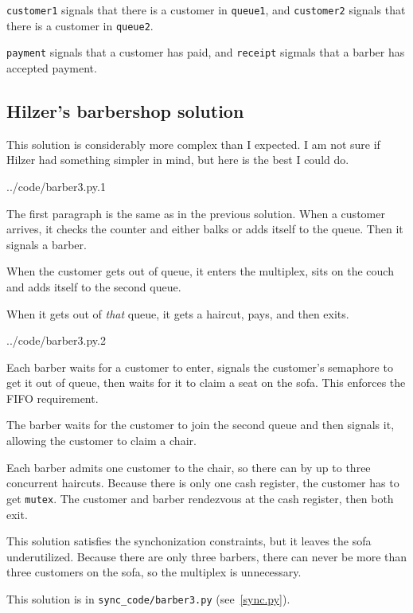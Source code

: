 \documentclass{book}
\newcommand{\clearemptydoublepage}{\newpage\cleardoublepage}
\begin{document}
{\tt customer1} signals that there is a customer in {\tt queue1}, and
{\tt customer2} signals that there is a customer in {\tt queue2}.

{\tt payment} signals that a customer has paid, and {\tt receipt}
sigmals that a barber has accepted payment.



\clearemptydoublepage
\subsection {Hilzer's barbershop solution}

This solution is considerably more complex than I expected.  I
am not sure if Hilzer had something simpler in mind, but here is the
best I could do.


{../code/barber3.py.1}

The first paragraph is the same as in the previous solution.  When
a customer arrives, it checks the counter and either balks or adds
itself to the queue.  Then it signals a barber.

When the customer gets out of queue, it enters the multiplex,
sits on the couch and adds itself to the second queue.

When it gets out of {\em that} queue, it gets a haircut, pays,
and then exits.


{../code/barber3.py.2}

Each barber waits for a customer to enter, signals the customer's
semaphore to get it out of queue, then waits for it to claim a seat
on the sofa.  This enforces the FIFO requirement.

The barber waits for the customer to join the second queue and then
signals it, allowing the customer to claim a chair.

Each barber admits one customer to the chair, so there can by up
to three concurrent haircuts.  Because there is only one cash
register, the customer has to get {\tt mutex}.  The customer
and barber rendezvous at the cash register, then both exit.

This solution satisfies the synchonization constraints, but it leaves
the sofa underutilized.  Because there are only three barbers, there
can never be more than three customers on the sofa, so the multiplex
is unnecessary.

This solution is in \verb"sync_code/barber3.py" (see~\ref{sync.py}).
\end{document}
